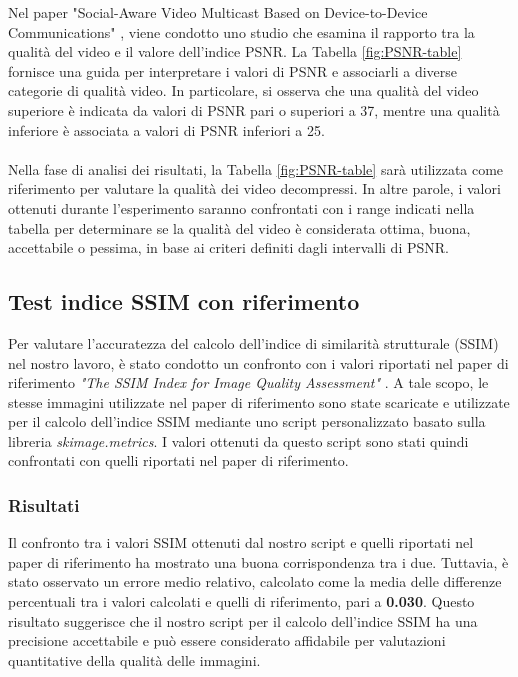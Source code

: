 Nel paper "Social-Aware Video Multicast Based on Device-to-Device Communications" \cite{Social-Aware}, viene condotto uno studio che esamina il rapporto tra la qualità del video e il valore dell'indice PSNR. La Tabella \ref{fig:PSNR-table} fornisce una guida per interpretare i valori di PSNR e associarli a diverse categorie di qualità video. In particolare, si osserva che una qualità del video superiore è indicata da valori di PSNR pari o superiori a 37, mentre una qualità inferiore è associata a valori di PSNR inferiori a 25.
\\
\\
Nella fase di analisi dei risultati, la Tabella \ref{fig:PSNR-table} sarà utilizzata come riferimento per valutare la qualità dei video decompressi. In altre parole, i valori ottenuti durante l'esperimento saranno confrontati con i range indicati nella tabella per determinare se la qualità del video è considerata ottima, buona, accettabile o pessima, in base ai criteri definiti dagli intervalli di PSNR.

\subsection{Test indice SSIM con riferimento}
Per valutare l'accuratezza del calcolo dell'indice di similarità strutturale (SSIM) nel nostro lavoro, è stato condotto un confronto con i valori riportati nel paper di riferimento \textit{"The SSIM Index for Image Quality Assessment"} \cite{TEST_SSIM}. A tale scopo, le stesse immagini utilizzate nel paper di riferimento sono state scaricate e utilizzate per il calcolo dell'indice SSIM mediante uno script personalizzato basato sulla libreria \textit{skimage.metrics}. I valori ottenuti da questo script sono stati quindi confrontati con quelli riportati nel paper di riferimento.
\subsubsection{Risultati}
Il confronto tra i valori SSIM ottenuti dal nostro script e quelli riportati nel paper di riferimento ha mostrato una buona corrispondenza tra i due. Tuttavia, è stato osservato un errore medio relativo, calcolato come la media delle differenze percentuali tra i valori calcolati e quelli di riferimento, pari a \textbf{0.030}.
Questo risultato suggerisce che il nostro script per il calcolo dell'indice SSIM ha una precisione accettabile e può essere considerato affidabile per valutazioni quantitative della qualità delle immagini.


